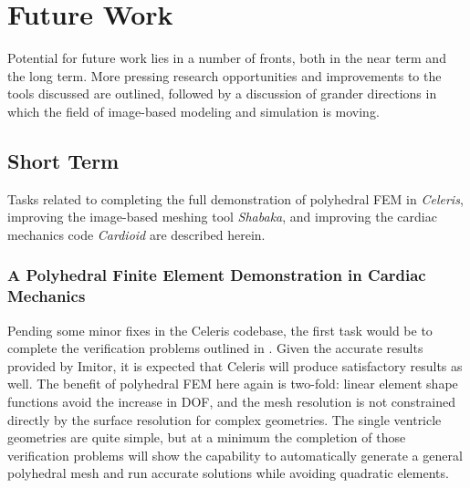 \chapter{Future Work}
\label{chap:6}

Potential for future work lies in a number of fronts, both in the near term and the long term. More pressing research opportunities and improvements to the tools discussed are outlined, followed by a discussion of grander directions in which the field of image-based modeling and simulation is moving.

\section{Short Term}
\label{Short Term}

Tasks related to completing the full demonstration of polyhedral FEM in \textit{Celeris}, improving the image-based meshing tool \textit{Shabaka}, and improving the cardiac mechanics code \textit{Cardioid} are described herein.

\subsection[A Polyhedral Finite Element Demonstration in Cardiac \\ Mechanics]{\texorpdfstring{A Polyhedral Finite Element Demonstration in Cardiac Mechanics}{A Polyhedral Finite Element Demonstration in Cardiac Mechanics}}
\label{A Polyhedral Finite Element Demonstration in Cardiac Mechanics}

Pending some minor fixes in the Celeris codebase, the first task would be to complete the verification problems outlined in . Given the accurate results provided by Imitor, it is expected that Celeris will produce satisfactory results as well. The benefit of polyhedral FEM here again is two-fold: linear element shape functions avoid the increase in DOF, and the mesh resolution is not constrained directly by the surface resolution for complex geometries. The single ventricle geometries are quite simple, but at a minimum the completion of those verification problems will show the capability to automatically generate a general polyhedral mesh and run accurate solutions while avoiding quadratic elements.

